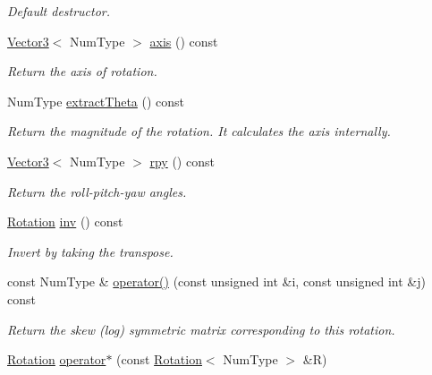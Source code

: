\begin{DoxyCompactItemize}
\begin{DoxyCompactList}\small\item\em Default destructor. \end{DoxyCompactList}\item 
\hyperlink{singletonscrews_1_1_translation}{Vector3}$<$ Num\+Type $>$ \hyperlink{classscrews_1_1_rotation_ae86a970692594f7333dfd3d6586b35fb}{axis} () const 
\begin{DoxyCompactList}\small\item\em Return the axis of rotation. \end{DoxyCompactList}\item 
Num\+Type \hyperlink{classscrews_1_1_rotation_a59d6940785a8a6c1562153e86080185b}{extract\+Theta} () const 
\begin{DoxyCompactList}\small\item\em Return the magnitude of the rotation. It calculates the axis internally. \end{DoxyCompactList}\item 
\hyperlink{singletonscrews_1_1_translation}{Vector3}$<$ Num\+Type $>$ \hyperlink{classscrews_1_1_rotation_ad72ac73a984be0d0cd320e9b9ba1d560}{rpy} () const 
\begin{DoxyCompactList}\small\item\em Return the roll-\/pitch-\/yaw angles. \end{DoxyCompactList}\item 
\hyperlink{classscrews_1_1_rotation}{Rotation} \hyperlink{classscrews_1_1_rotation_a48d23649b3c53ef24938e6e131b0f7d8}{inv} () const 
\begin{DoxyCompactList}\small\item\em Invert by taking the transpose. \end{DoxyCompactList}\item 
const Num\+Type \& \hyperlink{classscrews_1_1_rotation_abc04a3b626fd693c26e9c3ec51c5ddf2}{operator()} (const unsigned int \&i, const unsigned int \&j) const 
\begin{DoxyCompactList}\small\item\em Return the skew (log) symmetric matrix corresponding to this rotation. \end{DoxyCompactList}\item 
\hypertarget{classscrews_1_1_rotation_a6bdddaaf9119a865389e61766ffe2da5}{\hyperlink{classscrews_1_1_rotation}{Rotation} \hyperlink{classscrews_1_1_rotation_a6bdddaaf9119a865389e61766ffe2da5}{operator$\ast$} (const \hyperlink{classscrews_1_1_rotation}{Rotation}$<$ Num\+Type $>$ \&R)}\label{classscrews_1_1_rotation_a6bdddaaf9119a865389e61766ffe2da5}


\end{DoxyCompactItemize}
